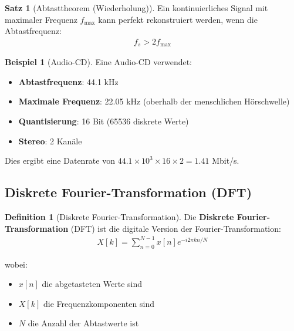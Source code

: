 ﻿\documentclass[a4paper,12pt]{report}
\theoremstyle{definition}
\newtheorem{definition}{Definition}
\newtheorem{beispiel}{Beispiel}
\newtheorem{satz}{Satz}
\begin{document}
	\begin{satz}[Abtasttheorem (Wiederholung)]
		Ein kontinuierliches Signal mit maximaler Frequenz $f_{\max}$ kann perfekt rekonstruiert werden, wenn die Abtastfrequenz:
		\begin{align}
			f_s > 2 f_{\max}
		\end{align}
	\end{satz}
	
	\begin{beispiel}[Audio-CD]
		Eine Audio-CD verwendet:
		\begin{itemize}
			\item[-] \textbf{Abtastfrequenz}: 44.1 kHz
			\item[-] \textbf{Maximale Frequenz}: 22.05 kHz (oberhalb der menschlichen Hörschwelle)
			\item[-] \textbf{Quantisierung}: 16 Bit (65536 diskrete Werte)
			\item[-] \textbf{Stereo}: 2 Kanäle
		\end{itemize}
		
		Dies ergibt eine Datenrate von $44.1 \times 10^3 \times 16 \times 2 = 1.41$ Mbit/s.
	\end{beispiel}
	
	\subsection{Diskrete Fourier-Transformation (DFT)}
	
	\begin{definition}[Diskrete Fourier-Transformation]
		Die \textbf{Diskrete Fourier-Transformation} (DFT) ist die digitale Version der Fourier-Transformation:
		\begin{align}
			X[k] = \sum_{n=0}^{N-1} x[n] e^{-i2\pi kn/N}
		\end{align}
		
		wobei:
		\begin{itemize}
			\item[-] $x[n]$ die abgetasteten Werte sind
			\item[-] $X[k]$ die Frequenzkomponenten sind
			\item[-] $N$ die Anzahl der Abtastwerte ist
		\end{itemize}
	\end{definition}
	
\end{document}
